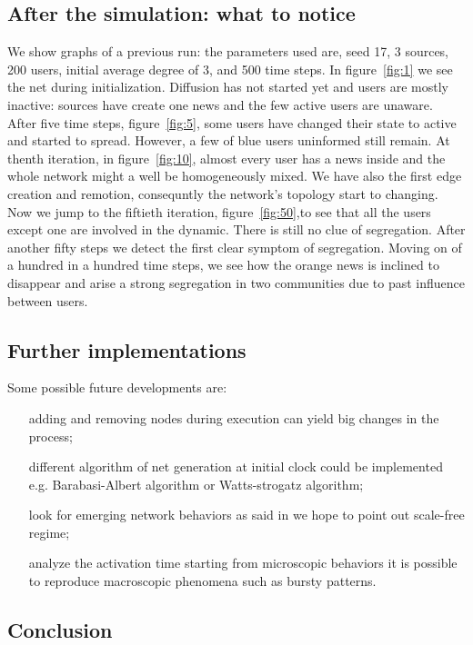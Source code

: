 \subsection{After the simulation: what to notice}\label{subsec:after}
We show graphs of a previous run: the parameters used are, seed 17, 3 sources,
200 users, initial average degree of 3, and 500 time steps.
In figure~\ref{fig:1} we see the net during initialization. Diffusion
has not started yet and users are mostly inactive:
sources have create one news and the few active users are unaware.
After five time steps, figure~\ref{fig:5}, some users have changed their state
to active and started to spread. However, a few of blue users uninformed still remain.
At thenth iteration, in figure~\ref{fig:10}, almost every user
has a news inside and the whole network might a well be homogeneously mixed. 
We have also the first edge creation and remotion, 
consequntly the network's topology start to changing.
Now we jump to the fiftieth iteration, figure~\ref{fig:50},to see that
all the users except one are involved in the dynamic. There is still no
clue of segregation.
After another fifty steps we detect the first clear symptom of segregation.
Moving on of a hundred in a hundred time steps, we see how the orange news
is inclined to disappear and arise a strong segregation in two communities
 due to past influence between users.

\subsection{Further implementations}\label{subsec:implementations}
Some possible future developments are:
\begin{itemize}
\item [adding and removing nodes during execution] can yield big changes
  in the process;
  \item [different algorithm of net generation] at initial clock could be implemented e.g. Barabasi-Albert algorithm or Watts-strogatz algorithm;
\item [look for emerging network behaviors] as said in \textit{} we hope to point out scale-free regime;
\item [analyze the activation time] starting from microscopic behaviors
  it is possible to reproduce macroscopic phenomena such as bursty
  patterns\cite{goh_burstiness_2008}.
\end{itemize}

\subsection{Conclusion}\label{subsec:conclusion}

